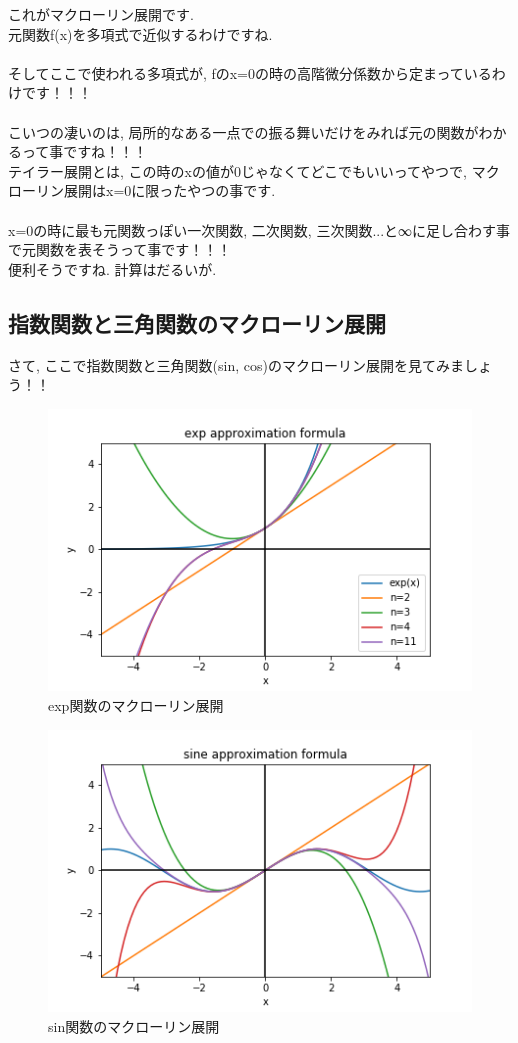 \documentclass[11pt,a4paper]{jreport}
\begin{document}
これがマクローリン展開です.\\
元関数f(x)を多項式で近似するわけですね.\\
\\
そしてここで使われる多項式が, fのx=0の時の高階微分係数から定まっているわけです！！！\\
\\
こいつの凄いのは, 局所的なある一点での振る舞いだけをみれば元の関数がわかるって事ですね！！！\\
テイラー展開とは, この時のxの値が0じゃなくてどこでもいいってやつで, マクローリン展開はx=0に限ったやつの事です.\\
\\
x=0の時に最も元関数っぽい一次関数, 二次関数, 三次関数...と∞に足し合わす事で元関数を表そうって事です！！！\\
便利そうですね. 計算はだるいが.\\
\subsection{指数関数と三角関数のマクローリン展開}
さて, ここで指数関数と三角関数(sin, cos)のマクローリン展開を見てみましょう！！\\

\begin{figure}[H]
\label{im:exp}
  \centering
  \includegraphics[width=120mm,bb=0 0 432 288]{figures/exp.png}
  \caption{exp関数のマクローリン展開}
\end{figure}
\begin{figure}[H]
\label{im:sine}
  \centering
  \includegraphics[width=120mm,bb=0 0 432 288]{figures/sine.png}
  \caption{sin関数のマクローリン展開}
\end{figure}
\end{document}
